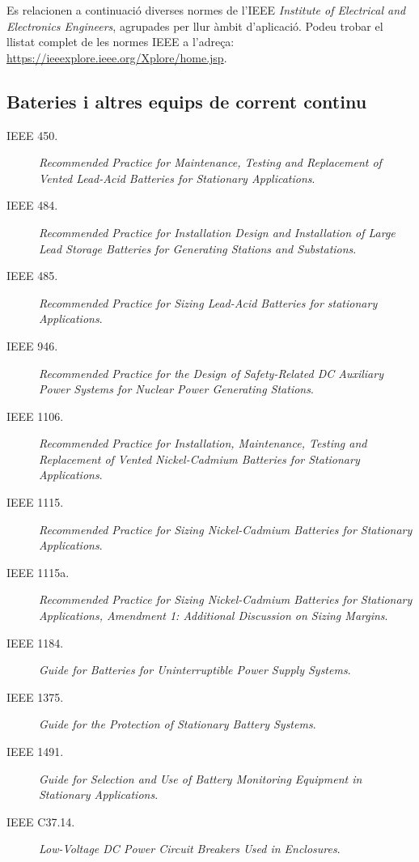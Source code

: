 Es relacionen a continuació diverses normes de l'IEEE \textit{Institute of Electrical and Electronics Engineers}, agrupades per llur àmbit d'aplicació. Podeu trobar el llistat complet de les normes IEEE a l'adreça: \href{https://ieeexplore.ieee.org/Xplore/home.jsp}{https:/\!\!/ieeexplore.ieee.org/Xplore/home.jsp}.

\subsection*{Bateries i altres equips de corrent continu}
\begin{description}
	\item [\hspace{5mm}IEEE 450.] \textit{Recommended Practice for  Maintenance, Testing and Replacement of Vented Lead-Acid Batteries for Stationary Applications}.
	\item [\hspace{5mm}IEEE 484.] \textit{Recommended Practice for Installation Design and Installation of Large Lead Storage Batteries for Generating Stations and Substations}.
	\item [\hspace{5mm}IEEE 485.] \textit{Recommended Practice for Sizing Lead-Acid Batteries for stationary Applications}.
	\item [\hspace{5mm}IEEE 946.] \textit{Recommended Practice for the Design of Safety-Related DC Auxiliary Power Systems for Nuclear Power Generating Stations}.
	\item [\hspace{5mm}IEEE 1106.] \textit{Recommended Practice for Installation, Maintenance, Testing and Replacement of Vented Nickel-Cadmium Batteries for Stationary Applications}.
	\item [\hspace{5mm}IEEE 1115.] \textit{Recommended Practice for Sizing Nickel-Cadmium Batteries for Stationary Applications}.
	\item [\hspace{5mm}IEEE 1115a.] \textit{Recommended Practice for Sizing Nickel-Cadmium Batteries for Stationary Applications, Amendment 1: Additional Discussion on Sizing Margins}.
	\item [\hspace{5mm}IEEE 1184.] \textit{Guide for Batteries for Uninterruptible Power Supply Systems}.
	\item [\hspace{5mm}IEEE 1375.] \textit{Guide for the Protection of Stationary Battery Systems}.
	\item [\hspace{5mm}IEEE 1491.] \textit{Guide for Selection and Use of Battery Monitoring Equipment in Stationary Applications}.
	\item [\hspace{5mm}IEEE C37.14.] \textit{Low-Voltage DC Power Circuit Breakers Used in Enclosures}.
\end{description}


